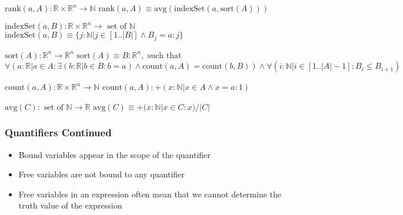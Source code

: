 \documentclass[t,12pt,numbers,fleqn]{beamer}
\begin{document}
\begin{frame}

\noindent $\mbox{rank}(a, A): \mathbb{R} \times \mathbb{R}^n \rightarrow \mathbb{N}$\newline
$\mbox{rank}(a, A) \equiv \mbox{avg}(\mbox{indexSet}(a, \mbox{sort}(A)))$\newline

\noindent $\mbox{indexSet}(a, B): \mathbb{R} \times \mathbb{R}^n \rightarrow \mbox{ set of }
\mathbb{N}$\newline
$\mbox{indexSet}(a, B) \equiv \{j: \mathbb{N} | j \in [1..|B|]
\wedge B_j = a : j \}$\newline

\noindent $\mbox{sort}(A): \mathbb{R}^n \rightarrow \mathbb{R}^n$\newline
$\mbox{sort}(A) \equiv B: \mathbb{R}^n, \mbox{ such that }$\newline
$\forall (a: \mathbb{R} | a \in A : \exists(b: \mathbb{R} | b \in B: b = a)
\wedge \mbox{count}(a, A) = \mbox{count}(b, B)) \wedge \forall (i: \mathbb{N} | i \in [1..|A|-1] : B_i \leq B_{i+1})$\newline

\noindent $\mbox{count}(a, A): \mathbb{R} \times \mathbb{R}^n \rightarrow \mathbb{N}$\newline
$\mbox{count}(a, A): + (x: \mathbb{N} | x \in A \wedge x = a : 1)$\newline

\noindent $\mbox{avg}(C): \mbox{ set of } \mathbb{N} \rightarrow \mathbb{R}$\newline
$\mbox{avg}(C) \equiv + (x: \mathbb{N} | x \in C : x) / |C|$\newline

\end{frame}


\begin{frame}
\frametitle{Quantifiers Continued}
\begin{itemize}
\item Bound variables appear in the scope of the quantifier
\item Free variables are not bound to any quantifier
\item Free variables in an expression often  mean that we cannot determine the truth value of the expression
\end{itemize}
\end{frame}
\end{document}
